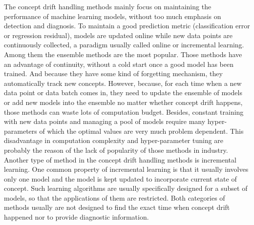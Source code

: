 \documentclass[twoside,11pt]{article}
\begin{document}
The concept drift handling methods mainly focus on maintaining the performance of machine learning models, without too much emphasis on detection and diagnosis. To maintain a good prediction metric (classification error or regression residual), models are updated online while new data points are continuously collected, a paradigm usually called online or incremental learning. Among them the ensemble methods are the most popular. Those methods have an advantage of continuity, without a cold start once a good model has been trained. And because they have some kind of forgetting mechanism, they automatically track new concepts. However, because, for each time when a new data point or data batch comes in, they need to update the ensemble of models or add new models into the ensemble no matter whether concept drift happens, those methods can waste lots of computation budget. Besides, constant training with new data points and managing a pool of models require many hyper-parameters of which the optimal values are very much problem dependent. This disadvantage in computation complexity and hyper-parameter tuning are probably the reason of the lack of popularity of those methods in industry. Another type of method in the concept drift handling methods is incremental learning. One common property of incremental learning is that it usually involves only one model and the model is kept updated to incorporate current state of concept. Such learning algorithms are usually specifically designed for a subset of models, so that the applications of them are restricted. Both categories of methods usually are not designed to find the exact time when concept drift happened nor to provide diagnostic information.
\end{document}
